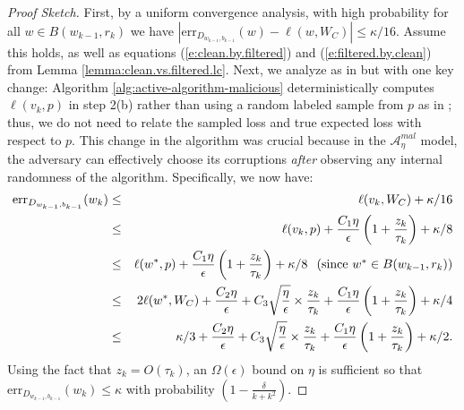 \documentclass[11pt]{article}
\newcommand{\err}{\mathrm{err}}
\newcommand{\0}{\mathbf{0}}
\newcommand{\1}{\mathbf{1}}
\newcommand{\cA}{\mathcal{A}}
\begin{document}
\begin{proof}[Proof Sketch]
First, by a uniform convergence analysis, with high probability for all $w \in B(w_{k-1},r_k)$ we have
$|\err_{D_{w_{k-1}, b_{k-1}}}({w}) - \ell(w,W_C)| \leq \kappa/16$. Assume this holds, as well as equations (\ref{e:clean.by.filtered}) and (\ref{e:filtered.by.clean}) from Lemma \ref{lemma:clean.vs.filtered.lc}. 
Next, we analyze as in \cite{awasthi2017power} but with one key change: Algorithm \ref{alg:active-algorithm-malicious} deterministically computes $\ell(v_k,p)$ in step 2(b) rather than using a random labeled sample from $p$ as in \cite{awasthi2017power}; thus, we do not need to relate the sampled loss and true expected loss with respect to $p$. This change in the algorithm was crucial because in the $\cA^{mal}_\eta$ model, the adversary can effectively choose its corruptions {\em after} observing any internal randomness of the algorithm.
Specifically, we now have:
\begin{eqnarray*}
\err_{D_{w_{k-1}, b_{k-1}}}({w_k}) & \leq & \ell({v_k},W_C) + \kappa/16\\
& \leq & \ell({v_k},p)
   + \frac{C_1 \eta}{\epsilon} \left(1 + \frac{z_k}{\tau_k}
                        \right)
   + \kappa/8
    \\
  & \leq & \ell(w^*,p)
   + \frac{C_1 \eta}{\epsilon} \left(1 + \frac{z_k}{\tau_k}
                        \right)
   + \kappa/8
    \mbox{\hspace{0.1in}(since $w^* \in B({w}_{k-1},r_k)$)} \\
   & \leq & 2 \ell(w^*,W_C)
        +  \frac{C_2 \eta}{\epsilon}
        + C_3 \sqrt{\frac{\eta}{\epsilon}} \times \frac{ z_k}{\tau_k}
     + \frac{C_1 \eta}{\epsilon} \left(1 + \frac{z_k}
                                           {\tau_k} \right)
   + \kappa/4 \\
  & \leq & \kappa/3
        +  \frac{C_2 \eta}{\epsilon}
        + C_3 \sqrt{\frac{\eta}{\epsilon}} \times \frac{ z_k}{\tau_k}
   + \frac{C_1 \eta}{\epsilon} \left(1 + \frac{z_k}{\tau_k} \right)
   + \kappa/2.
\end{eqnarray*}
Using the fact that $z_k = O(\tau_k)$,
an $\Omega(\epsilon)$ bound on
$\eta$ is sufficient so
that $\err_{D_{w_{k-1}, b_{k-1}}}({w_k}) \le \kappa$ with probability
$(1-\frac{\delta}{k+k^2})$. 


\end{proof}
\end{document}
